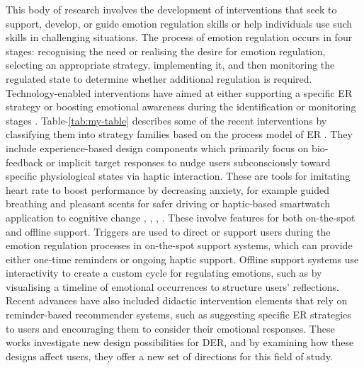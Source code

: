 This body of research involves the development of interventions that seek to support, develop, or guide emotion regulation skills or help individuals use such skills in challenging situations. The process of emotion regulation occurs in four stages: recognising the need or realising the desire for emotion regulation, selecting an appropriate strategy, implementing it, and then monitoring the regulated state to determine whether additional regulation is required. Technology-enabled interventions have aimed at either supporting a specific ER strategy or boosting emotional awareness during the identification or monitoring stages \cite{slovak2022designing}. 
Table-\ref{tab:my-table} describes some of the recent interventions by classifying them into strategy families based on the process model of ER \cite{wadley2020digital}.
They include experience-based design components which primarily focus on bio-feedback or implicit target responses to nudge users subconsciously toward specific physiological states via haptic interaction. These are tools for imitating heart rate to boost performance by decreasing anxiety, for example guided breathing and pleasant scents for safer driving or haptic-based smartwatch application to cognitive change \cite{smith2022digital}, \cite{paredes2018just}, \cite{dmitrenko2020caroma}, \cite{costa2019boostmeup}. These involve features for both on-the-spot and offline support. Triggers are used to direct or support users during the emotion regulation processes in on-the-spot support systems, which can provide either one-time reminders or ongoing haptic support. Offline support systems use interactivity to create a custom cycle for regulating emotions, such as by visualising a timeline of emotional occurrences to structure users' reflections. Recent advances have also included didactic intervention elements that rely on reminder-based recommender systems, such as suggesting specific ER strategies to users and encouraging them to consider their emotional responses. These works investigate new design possibilities for DER, and by examining how these designs affect users, they offer a new set of directions for this field of study.
\vspace{-0.15cm}
